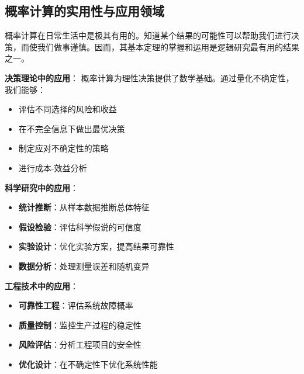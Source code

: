 \subsection{概率计算的实用性与应用领域}

\begin{theorembox}[title=概率计算的实践价值]
概率计算在日常生活中是极其有用的。知道某个结果的可能性可以帮助我们进行决策，而使我们做事谨慎。因而，其基本定理的掌握和运用是逻辑研究最有用的结果之一。

\textbf{决策理论中的应用}：
概率计算为理性决策提供了数学基础。通过量化不确定性，我们能够：
\begin{itemize}
\item 评估不同选择的风险和收益
\item 在不完全信息下做出最优决策
\item 制定应对不确定性的策略
\item 进行成本-效益分析
\end{itemize}

\textbf{科学研究中的应用}：
\begin{itemize}
\item \textbf{统计推断}：从样本数据推断总体特征
\item \textbf{假设检验}：评估科学假说的可信度
\item \textbf{实验设计}：优化实验方案，提高结果可靠性
\item \textbf{数据分析}：处理测量误差和随机变异
\end{itemize}

\textbf{工程技术中的应用}：
\begin{itemize}
\item \textbf{可靠性工程}：评估系统故障概率
\item \textbf{质量控制}：监控生产过程的稳定性
\item \textbf{风险评估}：分析工程项目的安全性
\item \textbf{优化设计}：在不确定性下优化系统性能
\end{itemize}
\end{theorembox}

